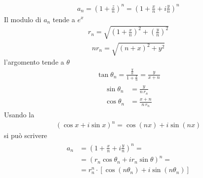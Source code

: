 \documentclass[letterpaper,10pt,italian]{jupyterBook}
\begin{document}
\sphinxAtStartPar
{}
\begin{equation*}
\begin{split}a_n = \left( 1 + \frac{z}{n} \right)^n = \left( 1 + \frac{x}{n} + i \frac{y}{n} \right)^n\end{split}
\end{equation*}
\sphinxAtStartPar
Il modulo di \(a_n\) tende a \(e^x\)
\begin{equation*}
\begin{split}r_n = \sqrt{\left(1+ \frac{x}{n}\right)^2 + \left(\frac{y}{n}\right)^2}\end{split}
\end{equation*}\begin{equation*}
\begin{split}n r_n = \sqrt{( n + x )^2 + y^2}\end{split}
\end{equation*}
\sphinxAtStartPar
l’argomento tende a \(\theta\)
\begin{equation*}
\begin{split}\tan \theta_n = \frac{\frac{y}{n}}{1 + \frac{x}{n}} = \frac{y}{x + n}\end{split}
\end{equation*}\begin{equation*}
\begin{split}\begin{aligned}
\sin \theta_n & = \frac{y}{n \, r_n} \\
\cos \theta_n & = \frac{x+n}{n \, r_n}
\end{aligned}\end{split}
\end{equation*}
\sphinxAtStartPar
Usando la 
\begin{equation*}
\begin{split}( \cos x + i \sin x)^n = \cos( n x ) + i \sin ( n x )\end{split}
\end{equation*}
\sphinxAtStartPar
si può scrivere
\begin{equation*}
\begin{split}\begin{aligned}
  a_n & = \left( 1 + \frac{x}{n} + i \frac{y}{n} \right)^n = \\
      & = \left( r_n \cos \theta_n + i r_n \sin \theta \right)^n = \\
      & = r_n^n \cdot \left[ \cos ( n \theta_n ) + i \sin (n \theta_n) \right]
\end{aligned}\end{split}
\end{equation*}
\end{document}

